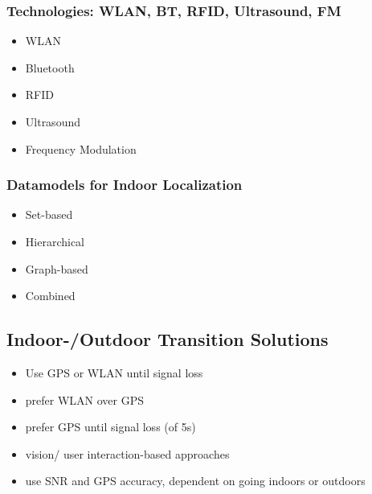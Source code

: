 \subsubsection{Technologies: WLAN, BT, RFID, Ultrasound, FM}
\begin{itemize}
	\item WLAN
	
	\item Bluetooth
	
	\item RFID
	
	\item Ultrasound
	
	\item Frequency Modulation
	
\end{itemize}

\subsubsection{Datamodels for Indoor Localization}

\begin{itemize}
	\item Set-based 
	
	\item Hierarchical 
	
	\item Graph-based 
	
	\item Combined
	
\end{itemize}

\subsection{Indoor-/Outdoor Transition Solutions}
\begin{itemize}
	\item Use GPS or WLAN until signal loss
	
	\item prefer WLAN over GPS
	
	\item prefer GPS until signal loss (of 5s)
	
	\item vision/ user interaction-based approaches
	
	\item use SNR and GPS accuracy, dependent on going indoors or outdoors
	
\end{itemize}

